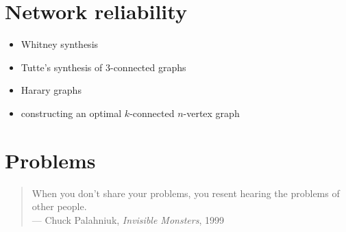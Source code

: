 
\section{Network reliability}

\begin{itemize}
\item Whitney synthesis

\item Tutte's synthesis of $3$-connected graphs

\item Harary graphs

\item constructing an optimal $k$-connected $n$-vertex graph
\end{itemize}



\section{Problems}

\begin{quote}
\footnotesize
When you don't share your problems, you resent hearing the problems of
other people. \\
\noindent
--- Chuck Palahniuk, \emph{Invisible Monsters}, 1999
\end{quote}

